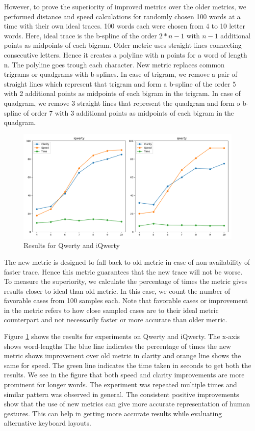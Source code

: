 \documentclass[MTech]{iitmdiss}
\begin{document}
However, to prove the superiority of improved metrics over the older metrics, we performed distance and speed calculations for randomly chosen 100 words at a time with their own ideal traces. 100 words each were chosen from 4 to 10 letter words. Here, ideal trace is the b-spline of the order $2*n-1$ with $n-1$ additional points as midpoints of each bigram. Older metric uses straight lines connecting consecutive letters. Hence it creates a polyline with n points for a word of length n. The polyline goes trough each character. New metric replaces common trigrams or quadgrams with b-splines. In case of trigram, we remove a pair of straight lines which represent that trigram and form a b-spline of the order 5 with 2 additional points as midpoints of each bigram in the trigram. In case of quadgram, we remove 3 straight lines that represent the quadgram and form o b-spline of order 7 with 3 additional points as midpoints of each bigram in the quadgram. 


\begin{figure}[h!] 
	\centering
	\includegraphics[scale=0.5]{Images/result}
	\caption{Results for Qwerty and iQwerty}
	\label{fig:results}
\end{figure}


The new metric is designed to fall back to old metric in case of non-availability of faster trace. Hence this metric guarantees that the new trace will not be worse. To measure the superiority, we calculate the percentage of times the metric gives results closer to ideal than old metric. In this case, we count the number of favorable cases from 100 samples each. Note that favorable cases or improvement in the metric refers to how close sampled cases are to their ideal metric counterpart and not necessarily faster or more accurate than older metric.


Figure \ref{fig:results} shows the results for experiments on Qwerty and iQwerty. The x-axis shows word-lengths The blue line indicates the percentage of times the new metric shows improvement over old metric in clarity and orange line shows the same for speed. The green line indicates the time taken in seconds to get both the results.  We see in the figure that both speed and clarity improvements are more prominent for longer words. The experiment was repeated multiple times and similar pattern was observed in general. The consistent positive improvements show that the use of new metrics can give more accurate representation of human gestures. This can help in getting more accurate results while evaluating alternative keyboard layouts.
\end{document}
